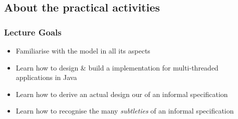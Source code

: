 \documentclass[presentation]{beamer}\mode<presentation>{\usetheme{AMSCesenaPurpleAndGold}}
\begin{document}
\subsection{About the practical activities}

\begin{frame}
	\frametitle{Lecture Goals}
	
	\begin{itemize}
		
		\item Familiarise with the \linda{} model in all its aspects
		
		\vfill
		
		\item Learn how to \alert{design \& build} a \linda{} implementation for multi-threaded applications in Java
		
		\vfill
		
		\item Learn how to derive an actual design our of an informal specification
		
		\vfill
		
		\item Learn how to recognise the many \emph{subtleties} of an informal specification
	\end{itemize}

\end{frame}
\end{document}
